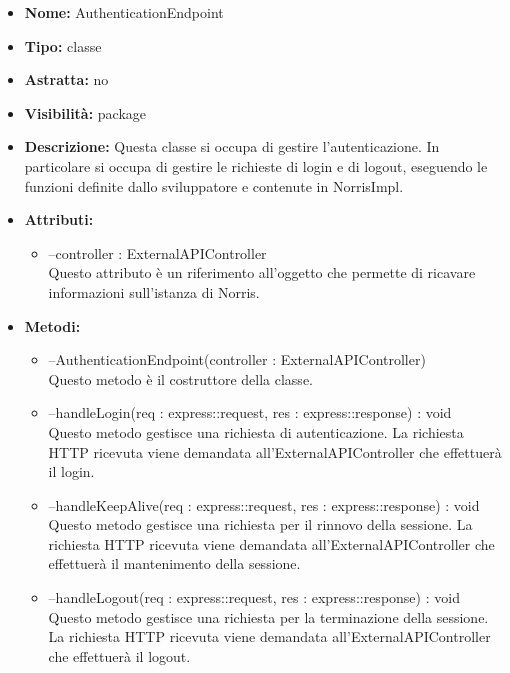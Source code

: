 			
			\begin{itemize}
			\item \textbf{Nome:} AuthenticationEndpoint
			\item \textbf{Tipo:} classe
			
		\item \textbf{Astratta:}
		no
			\item \textbf{Visibilità:} package
			\item \textbf{Descrizione:} Questa classe si occupa di gestire l'autenticazione. In particolare si occupa di gestire le richieste di login e di logout, eseguendo le funzioni definite dallo sviluppatore e contenute in NorrisImpl.
			\item \textbf{Attributi:}
				\begin{itemize}
				\setlength{\itemsep}{5pt}
				
					\item[\ding{111}] {--controller : ExternalAPIController} \\ [1mm] Questo attributo è un riferimento all'oggetto che permette di ricavare informazioni sull'istanza di Norris.
				\end{itemize}
		
			\item \textbf{Metodi:}
				\begin{itemize}
				\setlength{\itemsep}{5pt}
				
					\item[\ding{111}] {{--AuthenticationEndpoint(controller : ExternalAPIController)}} \\ [1mm] Questo metodo è il costruttore della classe.
					\item[\ding{111}] {{--handleLogin(req : express::request, res : express::response) : void}} \\ [1mm] Questo metodo gestisce una richiesta di autenticazione. La richiesta HTTP ricevuta viene demandata all'ExternalAPIController che effettuerà il login.
					\item[\ding{111}] {{--handleKeepAlive(req : express::request, res : express::response) : void}} \\ [1mm] Questo metodo gestisce una richiesta per il rinnovo della sessione. La richiesta HTTP ricevuta viene demandata all'ExternalAPIController che effettuerà il mantenimento della sessione.
					\item[\ding{111}] {{--handleLogout(req : express::request, res : express::response) : void}} \\ [1mm] Questo metodo gestisce una richiesta per la terminazione della sessione. La richiesta HTTP ricevuta viene demandata all'ExternalAPIController che effettuerà il logout.
				\end{itemize}
		
			\end{itemize}


